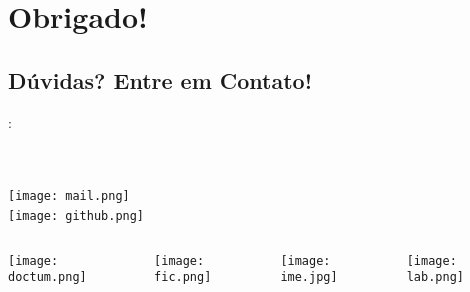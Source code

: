 \section*{Obrigado!}
\label{sec:obrigado}

\subsection*{Dúvidas? Entre em Contato!}
\begin{frame}
	\begin{block}{}
		\begin{center}
			\textbf{\mysubject}: \\[2ex] \mytitle\\[1ex]
		\end{center}
	\end{block}
	
	\vspace{1ex}
	
	\begin{center}
		\myauthor \\[4ex]          	
		\texttt{[image: mail.png]}\textcolor{white}{-} \myauthoremail \\
		\texttt{[image: github.png]}\textcolor{white}{-}\myauthorgit \\[4ex]
	\end{center}	
	
	\begin{columns}[T]
		\begin{column}[T]{2cm}		
			\texttt{[image: doctum.png]}\centering
		\end{column}
		
		\begin{column}[T]{2cm}		
			\texttt{[image: fic.png]}\centering
		\end{column}
		
		\begin{column}[T]{2cm}		
			\texttt{[image: ime.jpg]}\centering
		\end{column}
		
		\begin{column}[T]{2cm}	
			\texttt{[image: lab.png]}\centering	
		\end{column}
	\end{columns}
	
	\vspace{3ex}
\end{frame}